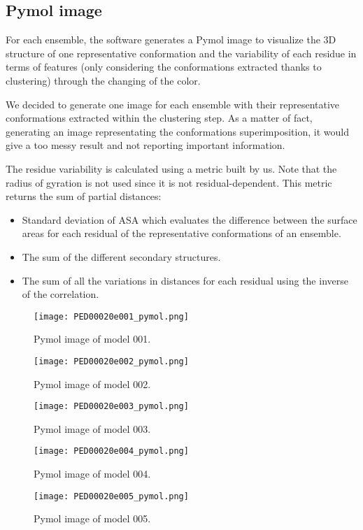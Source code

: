 \subsection{Pymol image}
For each ensemble, the software generates a Pymol image to visualize the 3D structure of one representative conformation and the variability of each residue in terms of features (only considering the conformations extracted thanks to clustering) through the changing of the color.

We decided to generate one image for each ensemble with their representative conformations extracted within the clustering step.
As a matter of fact, generating an image representating the conformations superimposition, it would give a too messy result and not reporting important information.

The residue variability is calculated using a metric built by us. Note that the radius of gyration is not used since it is not residual-dependent.
This metric returns the sum of partial distances:
\begin{itemize}
\item Standard deviation of ASA which evaluates the difference between the surface areas for each residual of the representative conformations of an ensemble.
\item The sum of the different secondary structures. %
\item The sum of all the variations in distances for each residual using the inverse of the correlation. %
\end{itemize}

\begin{figure}[H]
	\begin{minipage}[b]{0.97\textwidth}
		\centering
		\texttt{[image: PED00020e001\_pymol.png]}
		\caption{Pymol image of model 001.}
		\label{model001p}
	\end{minipage}
	\begin{minipage}[b]{0.97\textwidth}
		\centering
		\texttt{[image: PED00020e002\_pymol.png]}
		\caption{Pymol image of model 002.}
		\label{model002p}
	\end{minipage}
\end{figure}
\begin{figure}[H]
	\begin{minipage}[b]{0.99\textwidth}
		\centering
		\texttt{[image: PED00020e003\_pymol.png]}
		\caption{Pymol image of model 003.}
		\label{model003p}
	\end{minipage}
	\begin{minipage}[b]{0.99\textwidth}
		\centering
		\texttt{[image: PED00020e004\_pymol.png]}
		\caption{Pymol image of model 004.}
		\label{model004p}
	\end{minipage}
	\begin{minipage}[b]{0.99\textwidth}
		\centering
		\texttt{[image: PED00020e005\_pymol.png]}
		\caption{Pymol image of model 005.}
		\label{model005p}
	\end{minipage}
\end{figure}

